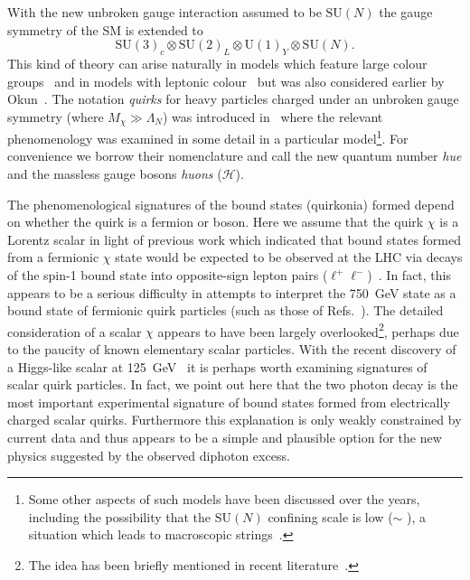 With the new unbroken gauge interaction assumed to be $\mathrm{SU}(N)$ the gauge
symmetry of the SM is extended to
\begin{equation}
  \label{eq:gaugegroup}
  \mathrm{SU(3)}_{c} \otimes \mathrm{SU}(2)_{L} \otimes \mathrm{U}(1)_{Y} \otimes \mathrm{SU}(N).
\end{equation}
This kind of theory can arise naturally in models which feature large colour
groups~\cite{Foot:1990jm, Foot:2011xu, Gherghetta:2016fhp} and in models with
leptonic colour~\cite{Foot:1990dw, Foot:1991fk, Foot:2006ie, Clarke:2011aa} but
was also considered earlier by Okun~\cite{Okun:1980mu}. The notation
\textit{quirks} for heavy particles charged under an unbroken gauge symmetry
(where $M_\chi \gg \Lambda_{N}$) was introduced in~\cite{Carlson:1991zn} where
the relevant phenomenology was examined in some detail in a particular
model\footnote{Some other aspects of such models have been discussed over the
  years, including the possibility that the $\mathrm{SU}(N)$ confining scale is
  low ($\sim$ \keV), a situation which leads to macroscopic
  strings~\cite{Kang:2008ea}.}. For convenience we borrow their nomenclature and
call the new quantum number \textit{hue} and the massless gauge bosons
\textit{huons} ($\mathcal{H}$).

The phenomenological signatures of the bound states (quirkonia) formed depend on
whether the quirk is a fermion or boson. Here we assume that the quirk $\chi$ is
a Lorentz scalar in light of previous work which indicated that bound states
formed from a fermionic $\chi$ state would be expected to be observed at the LHC
via decays of the spin-1 bound state into opposite-sign lepton pairs
($\ell^+\ell^-$)~\cite{Carlson:1991zn, Clarke:2011aa}. In fact, this appears to
be a serious difficulty in attempts to interpret the \SI{750}{\GeV} state as a
bound state of fermionic quirk particles (such as those of
Refs.~\cite{Kats:2016kuz, Curtin:2015jcv, Kamenik:2016izk}). The detailed
consideration of a scalar $\chi$ appears to have been largely
overlooked\footnote{The idea has been briefly mentioned in recent
  literature~\cite{Agrawal:2015dbf, Ko:2016sht}.}, perhaps due to the paucity of
known elementary scalar particles. With the recent discovery of a Higgs-like
scalar at \SI{125}{\GeV}~\cite{Aad:2012tfa, Chatrchyan:2012ufa} it is perhaps
worth examining signatures of scalar quirk particles. In fact, we point out here
that the two photon decay is the most important experimental signature of bound
states formed from electrically charged scalar quirks. Furthermore this
explanation is only weakly constrained by current data and thus appears to be a
simple and plausible option for the new physics suggested by the observed
diphoton excess.

